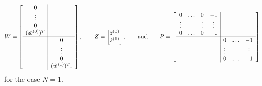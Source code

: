 \begin{align*}
 W =
 \left[
 \begin{array}{c|c}
  0          & \\
  \vdots     & \\ 
  0          & \\ 
  (\hat{w}^{(0)})^T & \\ \hline
             & 0 \\
             & \vdots \\ 
             & 0 \\ 
             & (\hat{w}^{(1)})^T, 
 \end{array}
 \right], 
 \qquad
 Z = 
 \begin{bmatrix}
  \hat{z}^{(0)} \\ \hat{z}^{(1)}
 \end{bmatrix}, \qquad\text{and}\qquad
 P = 
 \left[
 \begin{array}{cccc|cccc}
  0       & \hdots & 0      & -1     &        &        &        \\
  \vdots  &        & \vdots & \vdots &        &        &        \\
  0       & \hdots & 0      & -1     &        &        &        \\ \hline
          &        &        &        & 0      & \hdots & -1     \\ 
          &        &        &        & \vdots &        & \vdots \\ 
          &        &        &        & 0      & \hdots & -1
 \end{array}
 \right]
\end{align*}
for the case $N = 1$.

